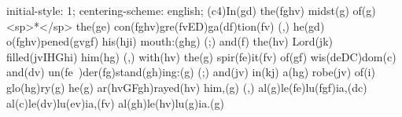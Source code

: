 initial-style: 1;
centering-scheme: english;
(c4)In(gd) the(fghv) midst(g) of(g) <sp>*</sp> the(ge) con(fghv)gre(fvED)ga(df)tion(fv) (,) he(gd) o(fghv)pened(gvgf) his(hji) mouth:(ghg) (;) and(f) the(hv) Lord(jk) filled(jvIHGhi) him(hg) (,) with(hv) the(g) spir(fe)it(fv) of(gf) wis(deDC)dom(c) and(dv) un(fe~)der(fg)stand(gh)ing:(g) (;) and(jv) in(kj) a(hg) robe(jv) of(i) glo(hg)ry(g) he(g) ar(hvGFgh)rayed(hv) him,(g) (,) al(g)le(fe)lu(fgf)ia,(dc) al(c)le(dv)lu(ev)ia,(fv) al(gh)le(hv)lu(g)ia.(g)
